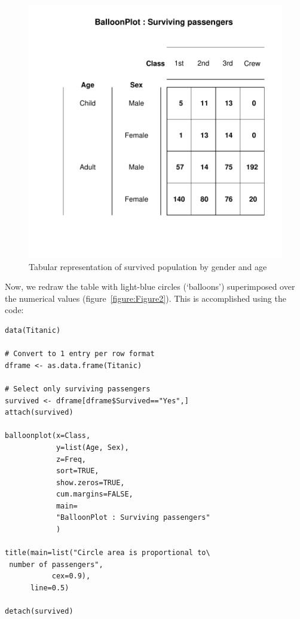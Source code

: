 \documentclass[a4paper]{report}
\begin{document}
\begin{article}
\begin{figure}
\includegraphics[width=\textwidth]{Figure1.pdf}
\caption{\label{figure:Figure1}
Tabular representation of survived population by gender and age}
\end{figure}


Now, we redraw the table with light-blue circles (`balloons')
superimposed over the numerical values (figure~\ref{figure:Figure2}).
This is accomplished using the code:

{\small
\begin{verbatim}
data(Titanic)

# Convert to 1 entry per row format
dframe <- as.data.frame(Titanic) 

# Select only surviving passengers
survived <- dframe[dframe$Survived=="Yes",]
attach(survived)

balloonplot(x=Class,
            y=list(Age, Sex),
            z=Freq,
            sort=TRUE,
            show.zeros=TRUE,
            cum.margins=FALSE,
            main=
            "BalloonPlot : Surviving passengers"
            )

title(main=list("Circle area is proportional to\
 number of passengers",
           cex=0.9),
      line=0.5)

detach(survived)
\end{verbatim}
}


\end{article}
\end{document}
